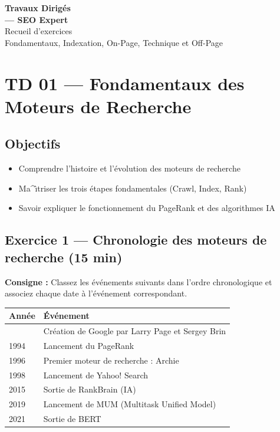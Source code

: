 \documentclass[12pt,a4paper]{report}
\begin{document}
\begin{titlepage}
\centering
\vspace*{4cm}
{\Huge \textbf{Travaux Dirigés}}\\
\vspace{0.5cm}
{\Huge \textbf{--- SEO Expert}}\\
\vspace{2cm}
{\Large Recueil d'exercices}\\
\vspace{1cm}
{\large Fondamentaux, Indexation, On-Page, Technique et Off-Page}
\vfill
\end{titlepage}

\tableofcontents
\clearpage

\chapter{TD 01 --- Fondamentaux des Moteurs de Recherche}

\section{Objectifs}
\begin{itemize}
    \item Comprendre l'histoire et l'\'{e}volution des moteurs de recherche
    \item Ma^{\^\i}triser les trois \'{e}tapes fondamentales (Crawl, Index, Rank)
    \item Savoir expliquer le fonctionnement du PageRank et des algorithmes IA
\end{itemize}

\section{Exercice 1 --- Chronologie des moteurs de recherche (15 min)}

\textbf{Consigne :} Classez les \'{e}v\'{e}nements suivants dans l'ordre chronologique et associez chaque date \`{a} l'\'{e}v\'{e}nement correspondant.

\begin{longtable}{ll}
\toprule
Ann\'{e}e & \'{E}v\'{e}nement \\
\midrule
\endhead
\bottomrule
\endfoot
1990 & Cr\'{e}ation de Google par Larry Page et Sergey Brin \\
1994 & Lancement du PageRank \\
1996 & Premier moteur de recherche : Archie \\
1998 & Lancement de Yahoo! Search \\
2015 & Sortie de RankBrain (IA) \\
2019 & Lancement de MUM (Multitask Unified Model) \\
2021 & Sortie de BERT \\
\bottomrule
\end{longtable}
\end{document}
